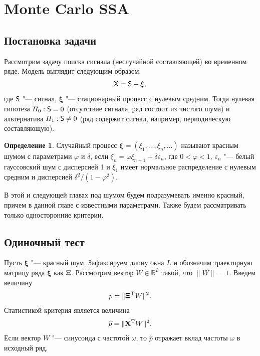 \documentclass[specialist,
substylefile = spbu_report.rtx,
subf,href,colorlinks=true, 12pt]{disser}
\theoremstyle{definition}
\newtheorem{definition}{Определение}
\newcommand{\R}{\mathbb{R}}
\newcommand{\bfxi}{\boldsymbol{\xi}}
\begin{document}
\section{Monte Carlo SSA}\label{sect:mc-ssa}
\subsection{Постановка задачи}
Рассмотрим задачу поиска сигнала (неслучайной составляющей) во временном ряде. Модель выглядит следующим образом:
\[
\tX=\tS + \bfxi,
\]
где $\mathsf{S}$ "--- сигнал, $\bfxi$ "--- стационарный процесс с нулевым средним. Тогда нулевая гипотеза $H_0:\mathsf{S}=0$ (отсутствие сигнала, ряд состоит из чистого шума) и альтернатива $H_1:\mathsf{S}\ne0$ (ряд содержит сигнал, например, периодическую составляющую).
\begin{definition}
	Случайный процесс $\bfxi=(\xi_1,\dots,\xi_n, \ldots)$ называют красным шумом с параметрами $\varphi$ и $\delta$, если $\xi_n = \varphi\xi_{n-1} + \delta\varepsilon_n$, где $0<\varphi<1$, $\varepsilon_n$ "--- белый гауссовский шум с дисперсией 1 и $\xi_1$ имеет нормальное распределение с нулевым средним и дисперсией $\delta^2/(1-\varphi^2)$.
\end{definition}
В этой и следующей главах под шумом будем подразумевать именно красный, причем в данной главе с известными параметрами.   Также будем рассматривать только односторонние критерии.

\subsection{Одиночный тест}\label{sect:single_test}
Пусть $\bfxi$ "--- красный шум. Зафиксируем длину окна $L$ и обозначим траекторную матрицу ряда $\bfxi$ как $\mathbf\Xi$. Рассмотрим вектор $W\in \R^{L}$ такой, что $\|W\|=1$. Введем величину
\[
	p=\|\mathbf{\Xi}^{\mathrm{T}} W\|^2.
\]
Статистикой критерия является величина
\[
	\widehat{p}=\|\mathbf{X}^{\mathrm{T}} W\|^2.
\]
Если вектор $W$ "--- синусоида с частотой $\omega$, то $\widehat{p}$ отражает вклад частоты $\omega$ в исходный ряд.
\end{document}
